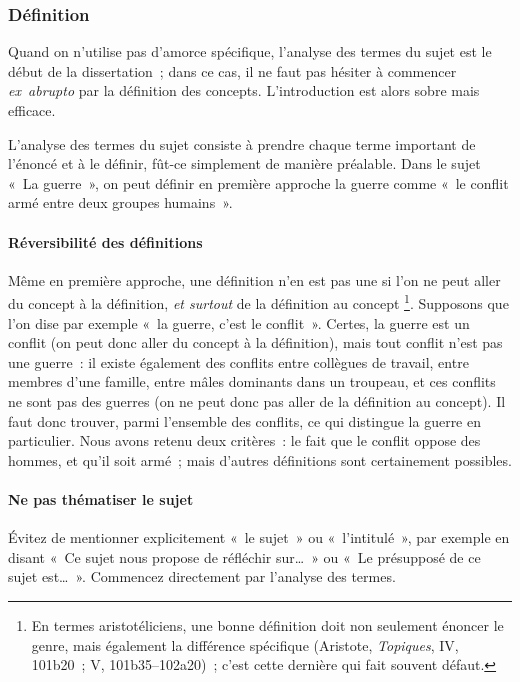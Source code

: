 \documentclass[a4paper]{article}
\begin{document}
\subsubsection{Définition}
\label{sec-2-2-1}

Quand on n'utilise pas d'amorce spécifique, l'analyse des termes du
sujet est le début de la dissertation ; dans ce cas, il ne faut pas
hésiter à commencer \emph{ex abrupto} par la définition des concepts.
L'introduction est alors sobre mais efficace.

L'analyse des termes du sujet consiste à prendre chaque terme important
de l'énoncé et à le définir, fût-ce simplement de manière préalable.
Dans le sujet « La guerre », on peut définir en première approche la
guerre comme « le conflit armé entre deux groupes humains ».

\paragraph{Réversibilité des définitions}
\label{sec-2-2-1-1}

Même en première approche, une définition n'en est pas une si l'on ne
peut aller du concept à la définition, \emph{et surtout} de la définition au
concept \footnote{En termes aristotéliciens, une bonne définition doit non seulement
énoncer le genre, mais également la différence spécifique (Aristote,
\emph{Topiques}, IV, 101b20 ; V, 101b35--102a20) ; c'est cette dernière
qui fait souvent défaut.}. Supposons que l'on dise par exemple « la guerre, c'est le
conflit ». Certes, la guerre est un conflit (on peut donc aller du
concept à la définition), mais tout conflit n'est pas une guerre : il
existe également des conflits entre collègues de travail, entre membres
d'une famille, entre mâles dominants dans un troupeau, et ces conflits
ne sont pas des guerres (on ne peut donc pas aller de la définition au
concept). Il faut donc trouver, parmi l'ensemble des conflits, ce qui
distingue la guerre en particulier. Nous avons retenu deux critères : le
fait que le conflit oppose des hommes, et qu'il soit armé ; mais
d'autres définitions sont certainement possibles.

\paragraph{Ne pas thématiser le sujet}
\label{sec-2-2-1-2}

Évitez de mentionner explicitement « le sujet » ou « l'intitulé », par
exemple en disant « Ce sujet nous propose de réfléchir sur\ldots{} » ou « Le
présupposé de ce sujet est\ldots{} ». Commencez directement par l'analyse des
termes.
\end{document}
